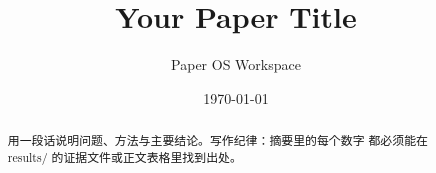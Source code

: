 \documentclass[11pt]{article}
\title{Your Paper Title}
\author{Paper OS Workspace}
\date{\today}
\begin{document}
\maketitle

\begin{abstract}
用一段话说明问题、方法与主要结论。写作纪律：摘要里的每个数字
都必须能在 results/ 的证据文件或正文表格里找到出处。
\end{abstract}







\end{document}
